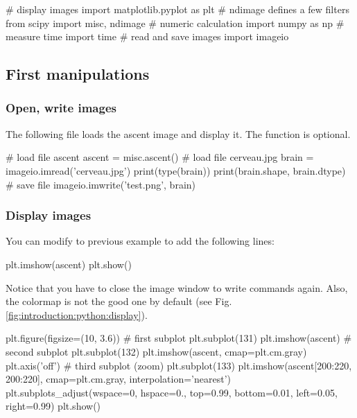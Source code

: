 \def\QRCODE{TB_image_TUT.IMG.introduction_pythonqrcode.png}
\def\QRPAGE{http://www.iptutorials.science/tree/master/TB_image/TUT.IMG.introduction/python}

\begin{python}
# display images
import matplotlib.pyplot as plt
# ndimage defines a few filters
from scipy import misc, ndimage
# numeric calculation
import numpy as np
# measure time
import time
# read and save images
import imageio
\end{python}

\vspace*{-10pt}
\subsection{First manipulations}

\subsubsection{Open, write images}
The following file loads the ascent image and display it. The  function is optional.


\begin{python}
# load file ascent
ascent = misc.ascent()
# load file cerveau.jpg
brain = imageio.imread('cerveau.jpg')
print(type(brain))
print(brain.shape, brain.dtype)
# save file
imageio.imwrite('test.png', brain)
\end{python}


\subsubsection{Display images}
You can modify to previous example to add the following lines:
\begin{python}
plt.imshow(ascent)
plt.show()
\end{python}
Notice that you have to close the image window to write commands again. Also, the colormap is not the good one by default (see Fig. \ref{fig:introduction:python:display}).

\begin{python}
plt.figure(figsize=(10, 3.6))
# first subplot
plt.subplot(131)
plt.imshow(ascent)
# second subplot
plt.subplot(132)
plt.imshow(ascent, cmap=plt.cm.gray)
plt.axis('off')
# third subplot (zoom)
plt.subplot(133)
plt.imshow(ascent[200:220, 200:220], cmap=plt.cm.gray, interpolation='nearest')
plt.subplots_adjust(wspace=0, hspace=0., 
                    top=0.99, bottom=0.01, 
                    left=0.05, right=0.99)
plt.show()
\end{python}

